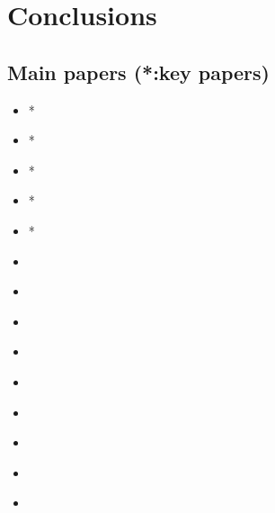 \documentclass[11pt,a4paper]{article}
\begin{document}
\section{Conclusions}

\newpage
\subsection*{Main papers (*:key papers)}
\begin{itemize}
    \item * \cite{CC2006I}
    \item * \cite{CC2006II}
    \item * \cite{RE2001}
    \item * \cite{RKW1988}
    \item * \cite{PC2008}
    \item \cite{birch2014scale}
    \item \cite{cohen2004response}
    \item \cite{gregory1997parametrization}
    \item \cite{houze1977structure}
    \item \cite{kershaw1997parametrization}
    \item \cite{robe1996moist}
    \item \cite{sakradzija2016stochastic}
    \item \cite{sengupta1990cumulus}
    \item \cite{TMM1982}
\end{itemize}


\printbibliography[title={References}]
\end{document}

